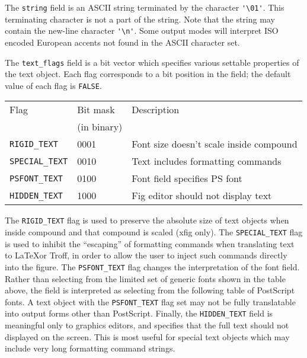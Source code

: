 The {\tt string} field is an ASCII string terminated by the character
	\verb|'\01'|.
This terminating character is not a part of the	string.
Note that the string may contain the new-line character \verb|'\n'|.
Some output modes will interpret ISO encoded European accents
	not found in the ASCII character set.

The {\tt text\_flags} field is a bit vector which specifies various
	settable properties of the text object.
Each flag corresponds to a bit position in the field; the default value
	of each flag is {\tt FALSE}.

\begin{center}
\begin{tabular}{|l|l|l|}
\hline
Flag			& Bit mask	& Description		\\
			& (in binary)	&			\\ \hline
\hline
%
{\tt RIGID\_TEXT}	& 0001	&
			Font size doesn't scale inside compound\\ \hline
%
{\tt SPECIAL\_TEXT}	& 0010	&  Text includes formatting commands \\ \hline
%
{\tt PSFONT\_TEXT}	& 0100	&  Font field specifies PS font	\\ \hline
%
{\tt HIDDEN\_TEXT}	& 1000	&  Fig editor should not display text \\ \hline
\end{tabular}
\end{center}

The {\tt RIGID\_TEXT} flag is used to preserve the absolute size of text
	objects when inside compound and that compound is scaled (xfig only).
The {\tt SPECIAL\_TEXT} flag is used to inhibit the ``escaping'' of formatting
	commands when translating text to \LaTeX or Troff, in order to allow
	the user to inject such commands directly into the figure.
The {\tt PSFONT\_TEXT} flag changes the interpretation of the font
	field.
Rather than selecting from the limited set of generic fonts shown in the table
	above, the field is interpreted as selecting from the following table
	of PostScript fonts.
A text object with the {\tt PSFONT\_TEXT} flag set may not be fully
	translatable into output forms other than PostScript.
Finally, the {\tt HIDDEN\_TEXT} field is meaningful only to graphics editors,
	and specifies that the full text should not displayed on the screen.
This is most useful for special text objects which may include very long
	formatting command strings.

